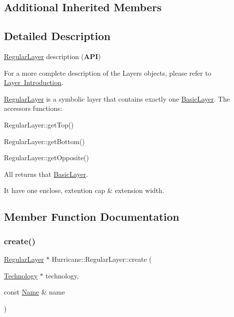 \subsection*{Additional Inherited Members}


\subsection{Detailed Description}
\mbox{\hyperlink{classHurricane_1_1RegularLayer}{Regular\+Layer}} description ({\bfseries A\+PI}) 

For a more complete description of the Layers objects, please refer to \mbox{\hyperlink{classHurricane_1_1Layer_secLayerIntro}{Layer Introduction}}.

\mbox{\hyperlink{classHurricane_1_1RegularLayer}{Regular\+Layer}} is a symbolic layer that contains exactly one \mbox{\hyperlink{classHurricane_1_1BasicLayer}{Basic\+Layer}}. The accessors functions\+: 
\begin{DoxyItemize}
\item Regular\+Layer\+::get\+Top() 
\item Regular\+Layer\+::get\+Bottom() 
\item Regular\+Layer\+::get\+Opposite() 
\end{DoxyItemize}All returns that \mbox{\hyperlink{classHurricane_1_1BasicLayer}{Basic\+Layer}}.

It have one enclose, extention cap \& extension width. 

\subsection{Member Function Documentation}
\mbox{\label{classHurricane_1_1RegularLayer_a88c2d5516f42b033ae2fdc0797e3dae1}} 
\subsubsection{\texorpdfstring{create()}{create()}}
{\footnotesize\ttfamily \mbox{\hyperlink{classHurricane_1_1RegularLayer}{Regular\+Layer}} $\ast$ Hurricane\+::\+Regular\+Layer\+::create (\begin{DoxyParamCaption}\item[{\mbox{\hyperlink{classHurricane_1_1Technology}{Technology}} $\ast$}]{technology,  }\item[{const \mbox{\hyperlink{classHurricane_1_1Name}{Name}} \&}]{name }\end{DoxyParamCaption})\hspace{0.3cm}{\ttfamily [static]}}

